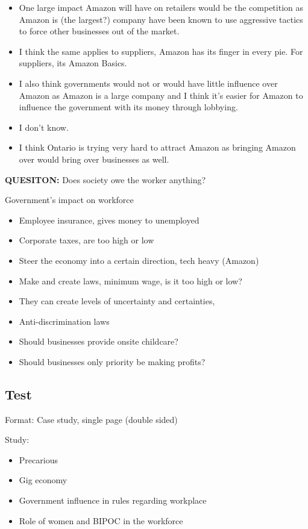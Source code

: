 \documentclass[11pt]{article}
\begin{document}
\begin{itemize}
    \item One large impact Amazon will have on retailers would be the competition as Amazon is (the largest?) company have been known to use aggressive tactics to force other businesses out of the market. 
    \item I think the same applies to suppliers, Amazon has its finger in every pie. For suppliers, its Amazon Basics.     
    \item I also think governments would not or would have little influence over Amazon as Amazon is a large company and I think it's easier for Amazon to influence the government with its money through lobbying.    
    \item I don't know.
    \item I think Ontario is trying very hard to attract Amazon as bringing Amazon over would bring over businesses as well. 
\end{itemize}

\textbf{QUESITON:} Does society owe the worker anything?

Government's impact on workforce
\begin{itemize}
    \item Employee insurance, gives money to unemployed
    \item Corporate taxes, are too high or low
    \item Steer the economy into a certain direction, tech heavy (Amazon)
    \item Make and create laws, minimum wage, is it too high or low?
    \item They can create levels of uncertainty and certainties, 
    \item Anti-discrimination laws
    \item Should businesses provide onsite childcare?
    \item Should businesses only priority be making profits?
\end{itemize}

\subsection{Test}

Format: Case study, single page (double sided)

Study:
\begin{itemize}
    \item Precarious
    \item Gig economy
    \item Government influence in rules regarding workplace
    \item Role of women and BIPOC in the workforce
\end{itemize}
\end{document}
